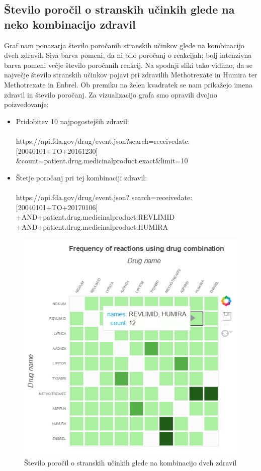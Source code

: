 \documentclass[a4paper,10pt]{article}
\begin{document}
\subsection{Število poročil o stranskih učinkih glede na neko kombinacijo zdravil}
Graf nam ponazarja število poročanih stranskih učinkov glede na kombinacijo dveh zdravil. Siva barva pomeni, da ni bilo poročanj o reakcijah; bolj intenzivna barva pomeni večje število poročanih reakcij. Na spodnji sliki tako vidimo, da se največje število stranskih učinkov pojavi pri zdravilih Methotrexate in Humira ter Methotrexate in Enbrel. Ob premiku na želen kvadratek se nam prikažejo imena zdravil in število poročanj.
Za vizualizacijo grafa smo opravili dvojno poizvedovanje:
\begin{itemize}
\item{Pridobitev 10 najpogostejših zdravil: \\ \\ https://api.fda.gov/drug/event.json?\newline search=receivedate:[20040101+TO+20161230] \newline \&count=patient.drug.medicinalproduct.exact\&limit=10}
\item{Štetje poročanj pri tej kombinaciji zdravil: \\ \\ https://api.fda.gov/drug/event.json? \newline search=receivedate:[20040101+TO+20170106] \newline +AND+patient.drug.medicinalproduct:REVLIMID \newline   +AND+patient.drug.medicinalproduct:HUMIRA}
\end{itemize}

\begin{figure}[H]
  \caption{Število poročil o stranskih učinkih glede na kombinacijo dveh zdravil}
  \centering
    \includegraphics[width=1\textwidth]{kombinacije.png}
\end{figure}
\end{document}

